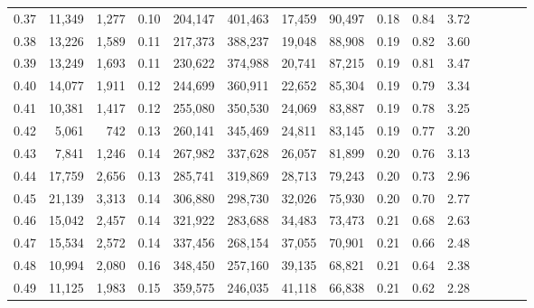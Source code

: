\begin{tabular}{rrrcrrrrrrrrrrr}
0.37 &  11,349 &   1,277 &                                       0.10 &  204,147 &  401,463 &   17,459 &   90,497 &  0.18 &  0.84 &                         3.72 \\
0.38 &  13,226 &   1,589 &                                       0.11 &  217,373 &  388,237 &   19,048 &   88,908 &  0.19 &  0.82 &                         3.60 \\
0.39 &  13,249 &   1,693 &                                       0.11 &  230,622 &  374,988 &   20,741 &   87,215 &  0.19 &  0.81 &                         3.47 \\
0.40 &  14,077 &   1,911 &                                       0.12 &  244,699 &  360,911 &   22,652 &   85,304 &  0.19 &  0.79 &                         3.34 \\
0.41 &  10,381 &   1,417 &                                       0.12 &  255,080 &  350,530 &   24,069 &   83,887 &  0.19 &  0.78 &                         3.25 \\
0.42 &   5,061 &     742 &                                       0.13 &  260,141 &  345,469 &   24,811 &   83,145 &  0.19 &  0.77 &                         3.20 \\
0.43 &   7,841 &   1,246 &                                       0.14 &  267,982 &  337,628 &   26,057 &   81,899 &  0.20 &  0.76 &                         3.13 \\
0.44 &  17,759 &   2,656 &                                       0.13 &  285,741 &  319,869 &   28,713 &   79,243 &  0.20 &  0.73 &                         2.96 \\
0.45 &  21,139 &   3,313 &                                       0.14 &  306,880 &  298,730 &   32,026 &   75,930 &  0.20 &  0.70 &                         2.77 \\
0.46 &  15,042 &   2,457 &                                       0.14 &  321,922 &  283,688 &   34,483 &   73,473 &  0.21 &  0.68 &                         2.63 \\
0.47 &  15,534 &   2,572 &                                       0.14 &  337,456 &  268,154 &   37,055 &   70,901 &  0.21 &  0.66 &                         2.48 \\
0.48 &  10,994 &   2,080 &                                       0.16 &  348,450 &  257,160 &   39,135 &   68,821 &  0.21 &  0.64 &                         2.38 \\
0.49 &  11,125 &   1,983 &                                       0.15 &  359,575 &  246,035 &   41,118 &   66,838 &  0.21 &  0.62 &                         2.28 \\

\end{tabular}
